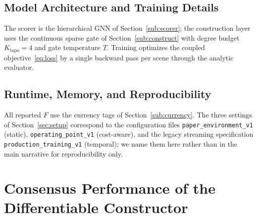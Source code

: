 \documentclass[journal]{IEEEtran}
\newcommand{\Ktopo}{\ensuremath{K_{\mathrm{topo}}}}      %
\begin{document}
\subsection{Model Architecture and Training Details}\label{sub:trainingdetails}

The scorer is the hierarchical GNN of Section~\ref{sub:scorer}; the construction
layer uses the continuous sparse gate of Section~\ref{sub:construct} with degree
budget $\Ktopo{=}4$ and gate temperature $T$. Training optimizes the coupled
objective~\eqref{eq:loss} by a single backward pass per scene through the analytic
evaluator.

\subsection{Runtime, Memory, and Reproducibility}\label{sub:repro}

All reported $F$ use the currency tags of Section~\ref{sub:currency}. The three
settings of Section~\ref{sec:setup} correspond to the configuration files
\texttt{paper\_environment\_v1} (static), \texttt{operating\_point\_v1}
(cost-aware), and the legacy streaming specification \texttt{production\_training\_v1}
(temporal); we name them here rather than in the main narrative for
reproducibility only.

\section{Consensus Performance of the Differentiable Constructor}\label{sec:main}
\end{document}
